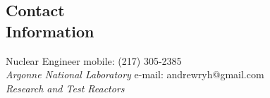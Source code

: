 \documentclass[margin,line]{resume}
\begin{document}
\begin{resume}

    \section{\mysidestyle Contact\\Information}

    Nuclear Engineer \hfill mobile: (217) 305-2385 
    \vspace{0mm}\\\vspace{0mm}
    \hspace{-1.35mm}\textsl{Argonne National Laboratory}
        \hfill e-mail: andrewryh@gmail.com            
        \vspace{0mm}\\\vspace{0mm}%
    \textsl{Research and Test Reactors}
       

\end{resume}
\end{document}
